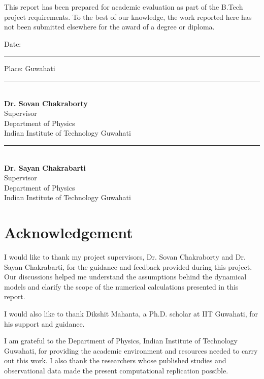 \documentclass[12pt,a4paper]{report}
\numberwithin{equation}{chapter}
\newcommand{\department}{Department of Physics}
\newcommand{\institute}{Indian Institute of Technology Guwahati}
\begin{document}
\vspace{0.7cm}
This report has been prepared for academic evaluation as part of the
B.Tech project requirements. To the best of our knowledge, the work
reported here has not been submitted elsewhere for the award of a degree
or diploma.

\vspace{0.5cm}
\vfill
\noindent Date: \rule{4cm}{0.4pt}\hfill Place: Guwahati

\vspace{1.5cm}
\noindent
\begin{minipage}[t]{0.48\textwidth}
  \rule{5.5cm}{0.4pt}\\[0.2cm]
  \textbf{Dr. Sovan Chakraborty}\\[0.1cm]
  Supervisor\\
  \department\\
  \institute
\end{minipage}
\hfill
\begin{minipage}[t]{0.48\textwidth}
  \raggedleft
  \rule{5.5cm}{0.4pt}\\[0.2cm]
  \textbf{Dr. Sayan Chakrabarti}\\[0.1cm]
  Supervisor\\
  \department\\
  \institute
\end{minipage}

\clearpage
\chapter*{Acknowledgement}
\vspace{0.7cm}

I would like to thank my project supervisors, Dr. Sovan Chakraborty and Dr. Sayan Chakrabarti, for the guidance
and feedback provided during this project. Our discussions helped me
understand the assumptions behind the dynamical models and clarify the
scope of the numerical calculations presented in this report.

I would also like to thank Dikshit Mahanta, a Ph.D. scholar at IIT Guwahati, for his support and guidance.

I am grateful to the \department, \institute, for providing the academic
environment and resources needed to carry out this work. I also thank
the researchers whose published studies and observational data made the
present computational replication possible.
\end{document}
